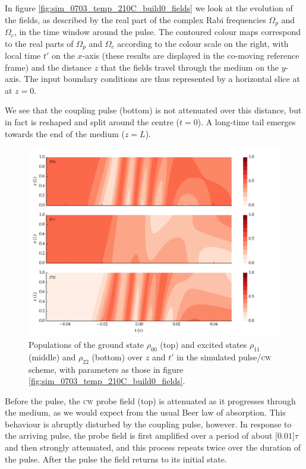     In figure \ref{fig:sim_0703_temp_210C_build0_fields} we look at the
    evolution of the fields, as described by the real part of the complex Rabi
    frequencies $\Omega_p$ and $\Omega_c$, in the time window around the pulse.
    The contoured colour maps correspond to the real parts of $\Omega_p$ and
    $\Omega_c$ according to the colour scale on the right, with local time $t'$
    on the $x$-axis (these results are displayed in the co-moving reference
    frame) and the distance $z$ that the fields travel through the medium on the
    $y$-axis. The input boundary conditions are thus represented by a horizontal
    slice at at $z\!=\!0$.

    We see that the coupling pulse (bottom) is not attenuated over this
    distance, but in fact is reshaped and split around the centre ($t=0$). A
    long-time tail emerges towards the end of the medium ($z\!=\!L$).

    \begin{figure}[h]
      \includegraphics[width=\linewidth]{figs/06_simultons/mb_vee2g_build0_15c_130p_0330t_230C_sb50_120vel000_00_002um_fig3.pdf}
      \caption{
      Populations of the ground state $\rho_{00}$ (top) and excited states
      $\rho_{11}$ (middle) and  $\rho_{22}$ (bottom) over $z$ and $t'$  in the
      simulated pulse/\textsc{cw} scheme, with parameters as those in figure
      \ref{fig:sim_0703_temp_210C_build0_fields}.
      }
      \label{fig:sim_0703_temp_210C_build0_pop}
    \end{figure}

    Before the pulse, the \textsc{cw} probe field (top) is attenuated as it
    progresses through the medium, as we would expect from the usual Beer law of
    absorption. This behaviour is abruptly disturbed by the coupling pulse,
    however. In response to the arriving pulse, the probe field is first
    amplified over a period of about \unit[$0.01$]{$\tau$} and then strongly
    attenuated, and this process repeats twice over the duration of the pulse.
    After the pulse the field returns to its initial state.

